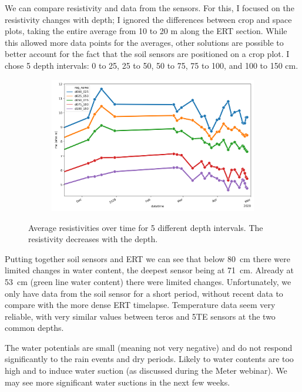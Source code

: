 \documentclass[a4paper,12pt]{article}
\begin{document}
We can compare resistivity and data from the sensors.
For this, I focused on the resistivity changes with depth; I ignored the differences between crop and space plots, taking the entire average from \num{10} to \num{20} \si{\meter} along the ERT section.
While this allowed more data points for the averages, other solutions are possible to better account for the fact that the soil sensors are positioned on a crop plot.
I chose 5 depth intervals: \num{0} to \num{25}, \num{25} to \num{50}, \num{50} to \num{75}, \num{75} to {100}, and \num{100} to \num{150} \si{\centi\meter}.

\begin{figure}[H]
\centering
\begin{subfigure}{\textwidth}
\includegraphics[width=\textwidth]{depth_analysis.png}
\end{subfigure}
\caption{Average resistivities over time for 5 different depth intervals.
The resistivity decreases with the depth.}
\end{figure}

Putting together soil sensors and ERT we can see that below \SI{80}{\centi\meter} there were limited changes in water content, the deepest sensor being at \SI{71}{\centi\meter}.
Already at \SI{53}{\centi\meter} (green line water content) there were limited changes. 
Unfortunately, we only have data from the soil sensor for a short period, without recent data to compare with the more dense ERT timelapse.
Temperature data seem very reliable, with very similar values between teros and 5TE sensors at the two common depths.

The water potentials are small (meaning not very negative) and do not respond significantly to the rain events and dry periods.
Likely to water contents are too high and to induce water suction (as discussed during the Meter webinar).
We may see more significant water suctions in the next few weeks.
\end{document}
